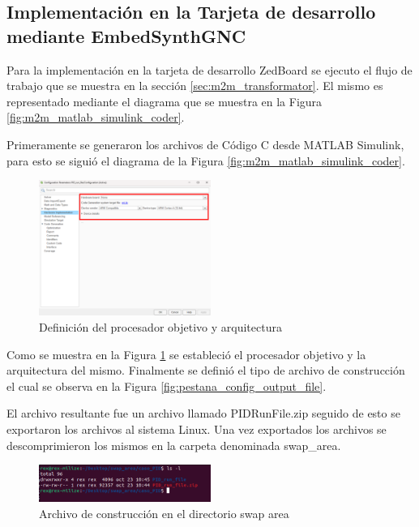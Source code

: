 \subsection{Implementación en la Tarjeta de desarrollo mediante EmbedSynthGNC}

Para la implementación en la tarjeta de desarrollo ZedBoard se ejecuto el flujo de trabajo que se muestra en la sección \ref{sec:m2m_transformator}. El mismo es representado mediante el diagrama que se muestra en la Figura \ref{fig:m2m_matlab_simulink_coder}.

Primeramente se generaron los archivos de Código C desde MATLAB Simulink, para esto se siguió el diagrama de la Figura \ref{fig:m2m_matlab_simulink_coder}. 

\begin{figure}[h!]
    \centering
    \includegraphics[width=0.5\textwidth]{fig/aditional/procesador_pid.pdf}
    \caption{Definición del procesador objetivo y arquitectura}
    \label{fig:system_target_PID}
\end{figure}

Como se muestra en la Figura \ref{fig:system_target_PID} se estableció el procesador objetivo y la arquitectura del mismo. Finalmente se definió el tipo de archivo de construcción el cual se observa en la Figura \ref{fig:pestana_config_output_file}. 

El archivo resultante fue un archivo llamado PIDRunFile.zip seguido de esto se exportaron los archivos al sistema Linux. Una vez exportados los archivos se descomprimieron los mismos en la carpeta denominada swap\_area.

\begin{figure}[h!]
    \centering
    \includegraphics[width=0.5\textwidth]{fig/Capitulo5/Caso_de_estudio_PID/retornos_consola/Screenshot from 2024-10-31 20-21-37.png}
    \caption{Archivo de construcción en el directorio swap area}
    \label{fig:swap_area_PID}
\end{figure}



